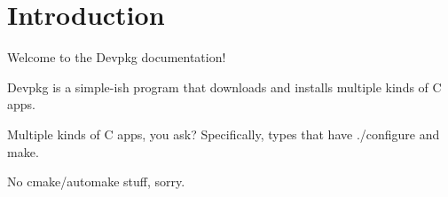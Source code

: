 \hypertarget{index_Introduction}{}\section{Introduction}\label{index_Introduction}
Welcome to the Devpkg documentation!

Devpkg is a simple-\/ish program that downloads and installs multiple kinds of C apps.

Multiple kinds of C apps, you ask? Specifically, types that have ./configure and make.

No cmake/automake stuff, sorry. 